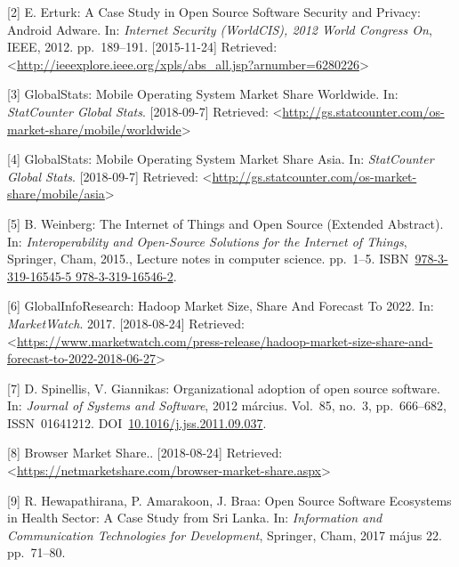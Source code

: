 \documentclass[12pt,magyar,a4paper,oneside]{scrreprt}
\begin{document}
\leavevmode\hypertarget{ref-erturk_case_2012}{}%
{[}2{]} E. Erturk: A Case Study in Open Source Software Security and
Privacy: Android Adware. In: \emph{Internet Security (WorldCIS), 2012
World Congress On}, IEEE, 2012. pp.~189--191. {[}2015-11-24{]}
Retrieved:
\textless{}\url{http://ieeexplore.ieee.org/xpls/abs_all.jsp?arnumber=6280226}\textgreater{}

\leavevmode\hypertarget{ref-globalstats_mobile_nodate}{}%
{[}3{]} GlobalStats: Mobile Operating System Market Share Worldwide. In:
\emph{StatCounter Global Stats}. {[}2018-09-7{]} Retrieved:
\textless{}\url{http://gs.statcounter.com/os-market-share/mobile/worldwide}\textgreater{}

\leavevmode\hypertarget{ref-globalstats_mobile_nodate-1}{}%
{[}4{]} GlobalStats: Mobile Operating System Market Share Asia. In:
\emph{StatCounter Global Stats}. {[}2018-09-7{]} Retrieved:
\textless{}\url{http://gs.statcounter.com/os-market-share/mobile/asia}\textgreater{}

\leavevmode\hypertarget{ref-weinberg_internet_2015}{}%
{[}5{]} B. Weinberg: The Internet of Things and Open Source (Extended
Abstract). In: \emph{Interoperability and Open-Source Solutions for the
Internet of Things}, Springer, Cham, 2015., Lecture notes in computer
science. pp.~1--5.
ISBN~\href{https://worldcat.org/isbn/978-3-319-16545-5\%20978-3-319-16546-2}{978-3-319-16545-5 978-3-319-16546-2}.

\leavevmode\hypertarget{ref-globalinforesearch_hadoop_2017}{}%
{[}6{]} GlobalInfoResearch: Hadoop Market Size, Share And Forecast To
2022. In: \emph{MarketWatch}. 2017. {[}2018-08-24{]} Retrieved:
\textless{}\url{https://www.marketwatch.com/press-release/hadoop-market-size-share-and-forecast-to-2022-2018-06-27}\textgreater{}

\leavevmode\hypertarget{ref-spinellis_organizational_2012}{}%
{[}7{]} D. Spinellis, V. Giannikas: Organizational adoption of open
source software. In: \emph{Journal of Systems and Software}, 2012
március. Vol.~85, no.~3, pp.~666--682, ISSN~01641212.
DOI~\href{https://doi.org/10.1016/j.jss.2011.09.037}{10.1016/j.jss.2011.09.037}.

\leavevmode\hypertarget{ref-noauthor_browser_nodate}{}%
{[}8{]} Browser Market Share.. {[}2018-08-24{]} Retrieved:
\textless{}\url{https://netmarketshare.com/browser-market-share.aspx}\textgreater{}

\leavevmode\hypertarget{ref-hewapathirana_open_2017}{}%
{[}9{]} R. Hewapathirana, P. Amarakoon, J. Braa: Open Source Software
Ecosystems in Health Sector: A Case Study from Sri Lanka. In:
\emph{Information and Communication Technologies for Development},
Springer, Cham, 2017 május 22. pp.~71--80.
\end{document}
